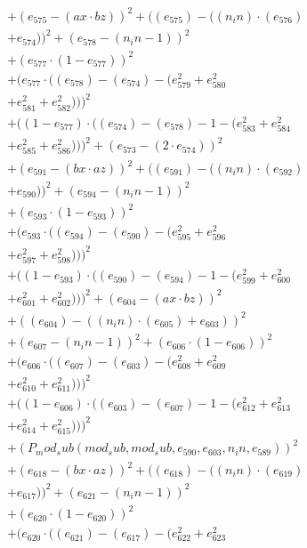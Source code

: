 \documentclass[10pt, a4paper]{article}
\begin{document}
\begin{small}
\begin{align*}
& + (e_{575} - (ax  \cdot  bz))^{2} + ((e_{575}) - ((n_in)  \cdot  (e_{576}) \\
& + e_{574}))^{2} + (e_{578} - (n_in - 1))^{2} \\
& + (e_{577}  \cdot  (1 - e_{577}))^{2} \\
& + (e_{577}  \cdot  ((e_{578}) - (e_{574}) - (e_{579}^{2} + e_{580}^{2} \\
& + e_{581}^{2} + e_{582}^{2})))^{2} \\
& + ((1 - e_{577})  \cdot  ((e_{574}) - (e_{578}) - 1 - (e_{583}^{2} + e_{584}^{2} \\
& + e_{585}^{2} + e_{586}^{2})))^{2} + (e_{573} - (2  \cdot  e_{574}))^{2} \\
& + (e_{591} - (bx  \cdot  az))^{2} + ((e_{591}) - ((n_in)  \cdot  (e_{592}) \\
& + e_{590}))^{2} + (e_{594} - (n_in - 1))^{2} \\
& + (e_{593}  \cdot  (1 - e_{593}))^{2} \\
& + (e_{593}  \cdot  ((e_{594}) - (e_{590}) - (e_{595}^{2} + e_{596}^{2} \\
& + e_{597}^{2} + e_{598}^{2})))^{2} \\
& + ((1 - e_{593})  \cdot  ((e_{590}) - (e_{594}) - 1 - (e_{599}^{2} + e_{600}^{2} \\
& + e_{601}^{2} + e_{602}^{2})))^{2} + (e_{604} - (ax  \cdot  bz))^{2} \\
& + ((e_{604}) - ((n_in)  \cdot  (e_{605}) + e_{603}))^{2} \\
& + (e_{607} - (n_in - 1))^{2} + (e_{606}  \cdot  (1 - e_{606}))^{2} \\
& + (e_{606}  \cdot  ((e_{607}) - (e_{603}) - (e_{608}^{2} + e_{609}^{2} \\
& + e_{610}^{2} + e_{611}^{2})))^{2} \\
& + ((1 - e_{606})  \cdot  ((e_{603}) - (e_{607}) - 1 - (e_{612}^{2} + e_{613}^{2} \\
& + e_{614}^{2} + e_{615}^{2})))^{2} \\
& + (P_mod_sub(mod_sub, mod_sub, e_{590}, e_{603}, n_in, e_{589}))^{2} \\
& + (e_{618} - (bx  \cdot  az))^{2} + ((e_{618}) - ((n_in)  \cdot  (e_{619}) \\
& + e_{617}))^{2} + (e_{621} - (n_in - 1))^{2} \\
& + (e_{620}  \cdot  (1 - e_{620}))^{2} \\
& + (e_{620}  \cdot  ((e_{621}) - (e_{617}) - (e_{622}^{2} + e_{623}^{2} \\

\end{align*}
\end{small}
\end{document}
